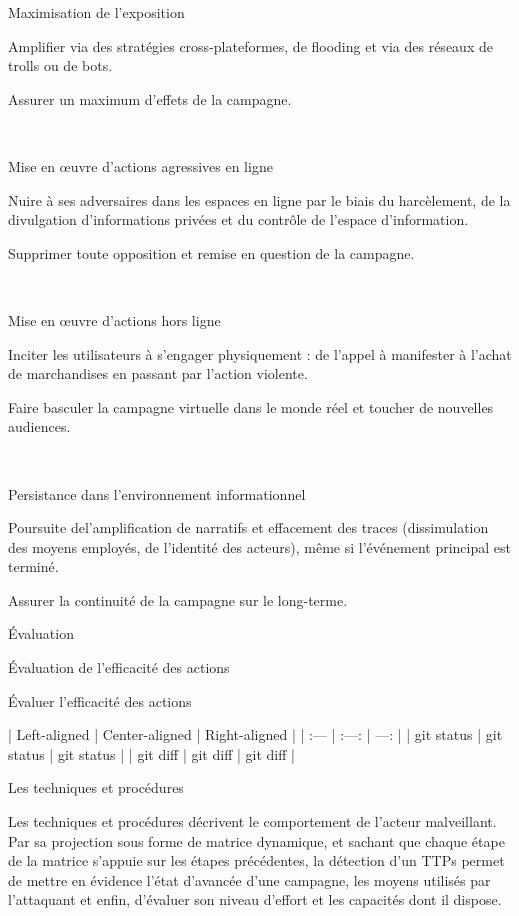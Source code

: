 Maximisation de l’exposition 
	

Amplifier via des stratégies cross-plateformes, de flooding et via des réseaux de trolls ou de bots.
	

Assurer un maximum d’effets de la campagne.

​
	

Mise en œuvre d’actions agressives en ligne
	

Nuire à ses adversaires dans les espaces en ligne par le biais du harcèlement, de la divulgation d'informations privées et du contrôle de l'espace d'information.
	

Supprimer toute opposition et remise en question de la campagne.

​
	

Mise en œuvre d’actions hors ligne 
	

Inciter les utilisateurs à s’engager physiquement : de l’appel à manifester à l’achat de marchandises en passant par l’action violente.
	

Faire basculer la campagne virtuelle dans le monde réel et toucher de nouvelles audiences.

​
	

Persistance dans l’environnement informationnel
	

Poursuite del’amplification de narratifs et effacement des traces (dissimulation des moyens employés, de l’identité des acteurs), même si l’événement principal est terminé.
	

Assurer la continuité de la campagne sur le long-terme.

Évaluation
	

Évaluation de l’efficacité des actions
	

Évaluer l’efficacité des actions
	

​| Left-aligned | Center-aligned | Right-aligned |
| :---         |     :---:      |          ---: |
| git status   | git status     | git status    |
| git diff     | git diff       | git diff      |

 


Les techniques et procédures

Les techniques et procédures décrivent le comportement de l’acteur malveillant. Par sa projection sous forme de matrice dynamique, et sachant que chaque étape de la matrice s’appuie sur les étapes précédentes, la détection d’un TTPs permet de mettre en évidence l’état d’avancée d’une campagne, les moyens utilisés par l’attaquant et enfin, d’évaluer son niveau d’effort et les capacités dont il dispose.

